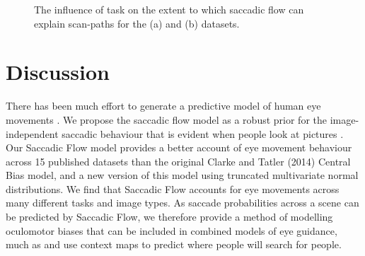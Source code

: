 \documentclass[a4paper, twocolumn, oneside, 11pt]{article}
\begin{document}
\begin{figure}
\centering
\caption{The influence of task on the extent to which saccadic flow can explain scan-paths for the (a) \cite{koehler2014} and (b) \cite{mills2011} datasets.}
\label{fig:taskLLH}
\end{figure}





\section{Discussion}

There has been much effort to generate a predictive model of human eye movements \citep{mit-saliency-benchmark,judd2009}. We propose the saccadic flow model as a robust prior for the image-independent saccadic behaviour that is evident when people look at pictures \citep{tatler-vincent2009}. Our Saccadic Flow model provides a better account of eye movement behaviour across 15 published datasets than the original Clarke and Tatler (2014) Central Bias model, and a new version of this model using truncated multivariate normal distributions. We find that Saccadic Flow accounts for eye movements across many different tasks and image types. As saccade probabilities across a scene can be predicted by Saccadic Flow, we therefore provide a method of modelling oculomotor biases that can be included in combined models of eye guidance, much as \cite{torralba2006} and \cite{ehinger2009} use context maps to predict where people will search for people.
\end{document}
